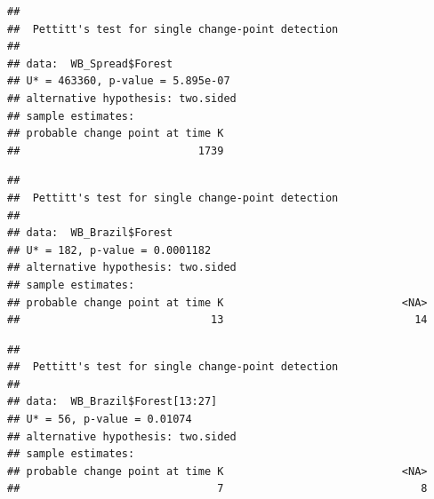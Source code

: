 \documentclass[12pt,]{article}
\newenvironment{Shaded}{\begin{snugshade}}{\end{snugshade}}
\newcommand{\KeywordTok}[1]{\textcolor[rgb]{0.13,0.29,0.53}{\textbf{#1}}}
\newcommand{\DecValTok}[1]{\textcolor[rgb]{0.00,0.00,0.81}{#1}}
\newcommand{\StringTok}[1]{\textcolor[rgb]{0.31,0.60,0.02}{#1}}
\newcommand{\CommentTok}[1]{\textcolor[rgb]{0.56,0.35,0.01}{\textit{#1}}}
\newcommand{\OperatorTok}[1]{\textcolor[rgb]{0.81,0.36,0.00}{\textbf{#1}}}
\newcommand{\NormalTok}[1]{#1}
\begin{document}
\begin{verbatim}
## 
##  Pettitt's test for single change-point detection
## 
## data:  WB_Spread$Forest
## U* = 463360, p-value = 5.895e-07
## alternative hypothesis: two.sided
## sample estimates:
## probable change point at time K 
##                            1739
\end{verbatim}

\begin{Shaded}
\end{Shaded}

\begin{verbatim}
## 
##  Pettitt's test for single change-point detection
## 
## data:  WB_Brazil$Forest
## U* = 182, p-value = 0.0001182
## alternative hypothesis: two.sided
## sample estimates:
## probable change point at time K                            <NA> 
##                              13                              14
\end{verbatim}

\begin{Shaded}
\end{Shaded}

\begin{verbatim}
## 
##  Pettitt's test for single change-point detection
## 
## data:  WB_Brazil$Forest[13:27]
## U* = 56, p-value = 0.01074
## alternative hypothesis: two.sided
## sample estimates:
## probable change point at time K                            <NA> 
##                               7                               8
\end{verbatim}

\begin{Shaded}
\end{Shaded}
\end{document}
